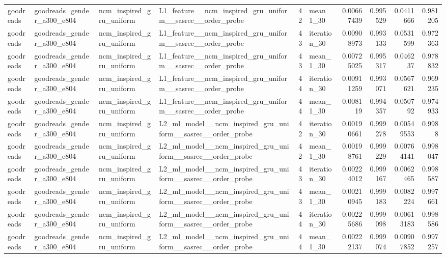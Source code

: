 \begin{table}[htbp!]
\begin{tabular}{llllrlrrrr}
goodreads & goodreads\_gender\_a300\_e804 & ncm\_inspired\_gru\_uniform & L1\_feature\_\_ncm\_inspired\_gru\_uniform\_\_sasrec\_\_order\_probe & 42 & mean\_1\_30 & 0.00667439 & 0.995529 & 0.0411666 & 0.981205 \\
goodreads & goodreads\_gender\_a300\_e804 & ncm\_inspired\_gru\_uniform & L1\_feature\_\_ncm\_inspired\_gru\_uniform\_\_sasrec\_\_order\_probe & 43 & iteration\_30 & 0.00908973 & 0.993133 & 0.0531599 & 0.972363 \\
goodreads & goodreads\_gender\_a300\_e804 & ncm\_inspired\_gru\_uniform & L1\_feature\_\_ncm\_inspired\_gru\_uniform\_\_sasrec\_\_order\_probe & 43 & mean\_1\_30 & 0.00725025 & 0.995317 & 0.046237 & 0.978832 \\
goodreads & goodreads\_gender\_a300\_e804 & ncm\_inspired\_gru\_uniform & L1\_feature\_\_ncm\_inspired\_gru\_uniform\_\_sasrec\_\_order\_probe & 44 & iteration\_30 & 0.00911259 & 0.993071 & 0.0567621 & 0.969235 \\
goodreads & goodreads\_gender\_a300\_e804 & ncm\_inspired\_gru\_uniform & L1\_feature\_\_ncm\_inspired\_gru\_uniform\_\_sasrec\_\_order\_probe & 44 & mean\_1\_30 & 0.008119 & 0.994357 & 0.050792 & 0.974933 \\
goodreads & goodreads\_gender\_a300\_e804 & ncm\_inspired\_gru\_uniform & L2\_ml\_model\_\_ncm\_inspired\_gru\_uniform\_\_sasrec\_\_order\_probe & 42 & iteration\_30 & 0.00190661 & 0.999278 & 0.00549553 & 0.9988 \\
goodreads & goodreads\_gender\_a300\_e804 & ncm\_inspired\_gru\_uniform & L2\_ml\_model\_\_ncm\_inspired\_gru\_uniform\_\_sasrec\_\_order\_probe & 42 & mean\_1\_30 & 0.00198761 & 0.999229 & 0.00764141 & 0.998047 \\
goodreads & goodreads\_gender\_a300\_e804 & ncm\_inspired\_gru\_uniform & L2\_ml\_model\_\_ncm\_inspired\_gru\_uniform\_\_sasrec\_\_order\_probe & 43 & iteration\_30 & 0.00224012 & 0.999167 & 0.0062465 & 0.998587 \\
goodreads & goodreads\_gender\_a300\_e804 & ncm\_inspired\_gru\_uniform & L2\_ml\_model\_\_ncm\_inspired\_gru\_uniform\_\_sasrec\_\_order\_probe & 43 & mean\_1\_30 & 0.00210945 & 0.999183 & 0.0082224 & 0.997661 \\
goodreads & goodreads\_gender\_a300\_e804 & ncm\_inspired\_gru\_uniform & L2\_ml\_model\_\_ncm\_inspired\_gru\_uniform\_\_sasrec\_\_order\_probe & 44 & iteration\_30 & 0.00225686 & 0.999098 & 0.00613183 & 0.998586 \\
goodreads & goodreads\_gender\_a300\_e804 & ncm\_inspired\_gru\_uniform & L2\_ml\_model\_\_ncm\_inspired\_gru\_uniform\_\_sasrec\_\_order\_probe & 44 & mean\_1\_30 & 0.00222137 & 0.999074 & 0.00907852 & 0.997257 \\

\end{tabular}
\end{table}
